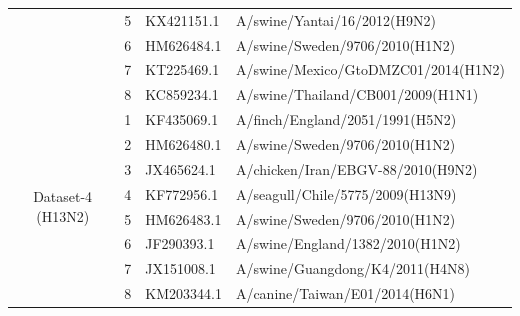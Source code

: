 \begin{table}[t]
\begin{tabular}{clll}
 & 5 & KX421151.1 & A/swine/Yantai/16/2012(H9N2) \\
 & 6 & HM626484.1 & A/swine/Sweden/9706/2010(H1N2) \\
 & 7 & KT225469.1 & A/swine/Mexico/GtoDMZC01/2014(H1N2) \\
 & 8 & KC859234.1 & A/swine/Thailand/CB001/2009(H1N1) \\
\midrule
\multirow{8}{*}{Dataset-4 (H13N2)} & 1 & KF435069.1 & A/finch/England/2051/1991(H5N2) \\
 & 2 & HM626480.1 & A/swine/Sweden/9706/2010(H1N2) \\
 & 3 & JX465624.1 & A/chicken/Iran/EBGV-88/2010(H9N2) \\
 & 4 & KF772956.1 & A/seagull/Chile/5775/2009(H13N9) \\
 & 5 & HM626483.1 & A/swine/Sweden/9706/2010(H1N2) \\
 & 6 & JF290393.1 & A/swine/England/1382/2010(H1N2) \\
 & 7 & JX151008.1 & A/swine/Guangdong/K4/2011(H4N8) \\
 & 8 & KM203344.1 & A/canine/Taiwan/E01/2014(H6N1) \\
\bottomrule
\end{tabular}
\end{table}

